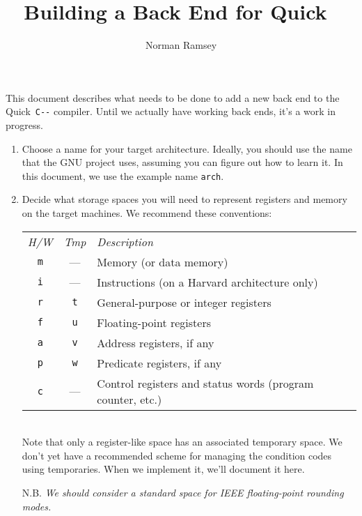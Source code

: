 \documentclass[12pt]{article}
\title{Building a Back End for Quick~{\PAL}}
\author{Norman Ramsey}
\newcommand\PAL{\texttt{C-{}-}}
\begin{document}
\maketitle

This document describes what needs to be done to add a new back end to
the Quick~{\PAL} compiler.
Until we actually have working back ends, it's a work in progress.

\begin{enumerate}
\item
Choose a name for your target architecture.
Ideally, you should use the name that the GNU project uses, assuming
you can figure out how to learn it.
In this document, we use the example name \texttt{arch}.
\item
Decide what storage spaces you will need to represent registers and
memory on the target machines.
We recommend these conventions:\\[3pt]
\begin{tabularx}{\linewidth}{@{\hskip1.5em}cc>{\raggedright\arraybackslash}X@{}}
\emph{H/W}& \emph{Tmp}& \emph{Description}\\
\texttt m& --- & Memory (or data memory)\\
\texttt i& --- & Instructions (on a Harvard architecture only)\\
\texttt r& \texttt t& General-purpose or integer registers\\
\texttt f& \texttt u& Floating-point registers\\
\texttt a& \texttt v& Address registers, if any\\
\texttt p& \texttt w& Predicate registers, if any\\
\texttt c& ---      & Control registers and status words (program
counter, etc.)\\
\end{tabularx}\\[3pt]
Note that only a register-like space has an associated temporary
space.
We don't yet have a recommended scheme for managing the condition
codes using temporaries. 
When we implement it, we'll document it here.

N.B. \emph{We should consider a standard space for IEEE floating-point
rounding modes.}



\end{enumerate}
\end{document}

